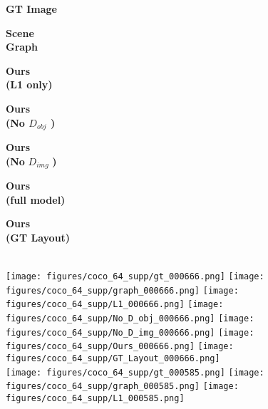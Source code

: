 \documentclass[10pt,twocolumn,letterpaper]{article}
\begin{document}
\begin{figure*}
  \newlength{\lossimgsize}
  \setlength{\lossimgsize}{0.138\textwidth}
  \centering
  \begin{minipage}{\lossimgsize}
    \centering
    \textbf{GT Image}
  \end{minipage}
  \begin{minipage}{\lossimgsize}
    \centering
    \textbf{Scene \\ Graph}
  \end{minipage}
  \begin{minipage}{\lossimgsize}
    \centering
    \textbf{Ours \\ (L1 only)}
  \end{minipage}
  \begin{minipage}{\lossimgsize}
    \centering
    \textbf{Ours \\ (No  $D_{obj}$ )}
  \end{minipage}
  \begin{minipage}{\lossimgsize}
    \centering
    \textbf{Ours \\ (No } $D_{img}$ \textbf{)}
  \end{minipage}
  \begin{minipage}{\lossimgsize}
    \centering
    \textbf{Ours \\ (full model)}
  \end{minipage}
  \begin{minipage}{\lossimgsize}
    \centering
    \textbf{Ours \\ (GT Layout)}
  \end{minipage} \\
  \texttt{[image: figures/coco\_64\_supp/gt\_000666.png]}
  \texttt{[image: figures/coco\_64\_supp/graph\_000666.png]}
  \texttt{[image: figures/coco\_64\_supp/L1\_000666.png]}
  \texttt{[image: figures/coco\_64\_supp/No\_D\_obj\_000666.png]}
  \texttt{[image: figures/coco\_64\_supp/No\_D\_img\_000666.png]}
  \texttt{[image: figures/coco\_64\_supp/Ours\_000666.png]}
  \texttt{[image: figures/coco\_64\_supp/GT\_Layout\_000666.png]} \\
  \texttt{[image: figures/coco\_64\_supp/gt\_000585.png]}
  \hspace*{6.6mm}\texttt{[image: figures/coco\_64\_supp/graph\_000585.png]}\hspace*{6.6mm}
  \texttt{[image: figures/coco\_64\_supp/L1\_000585.png]}

\end{figure*}
\end{document}
